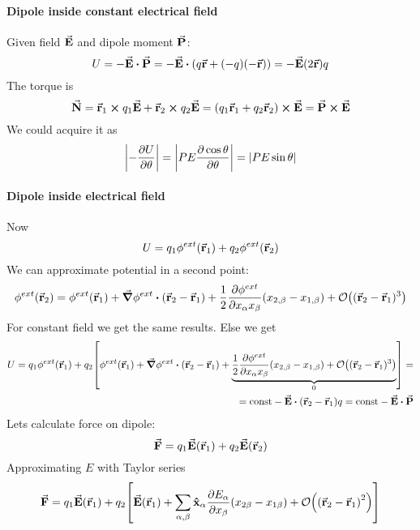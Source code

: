 \paragraph{Dipole inside constant electrical field}
Given field $\va{E}$ and dipole moment $\va{P}$:
$$U = - \va{E} \vdot \va{P} = -\va{E} \vdot \qty(q\va{r} + (-q) (-\va{r})) = -\va{E} (2\va{r})q$$
The torque is
$$\va{N}  = \va{r}_1 \cross q_1 \va{E} + \va{r}_2 \cross q_2 \va{E} = \qty(q_1\va{r}_1 + q_2 \va{r}_2)\cross  \va{E} =\va{P} \cross \va{E}$$
We could acquire it as
$$\qty|-\pdv{U}{\theta}| = \qty|PE\pdv{\cos \theta}{\theta}|  = \qty|PE\sin \theta|$$
\paragraph{Dipole inside electrical field}
Now
$$U = q_1 \phi^{ext} (\va{r}_1) + q_2 \phi^{ext} (\va{r}_2) $$
We can approximate potential in a second point:
$$\phi^{ext}(\va{r}_2) = \phi^{ext}(\va{r}_1) + \grad{\phi^{ext}} \vdot (\va{r}_2 -\va{r}_1) + \frac{1}{2} \pdv{\phi^{ext}}{x_\alpha x_\beta} (x_{2, \alpha}-x_{1, \alpha})(x_{2, \beta}-x_{1, \beta}) + \order{(\va{r}_2-\va{r}_1)^3}$$
For constant field we get the same results. Else we get
\begin{align*}
U = q_1 \phi^{ext} (\va{r}_1) + q_2 \qty[\phi^{ext}(\va{r}_1) + \grad{\phi^{ext}} \vdot (\va{r}_2 -\va{r}_1) + \underbrace{\frac{1}{2} \pdv{\phi^{ext}}{x_\alpha x_\beta} (x_{2, \alpha}-x_{1, \alpha})(x_{2, \beta}-x_{1, \beta}) + \order{(\va{r}_2-\va{r}_1)^3}}_{0}] =\\= \text{const} - \va{E}\vdot (\va{r}_2 -\va{r}_1) q =  \text{const} - \va{E}\vdot \va{P}
\end{align*}
Lets calculate force on dipole:
$$\va{F} = q_1 \va{E}(\va{r}_1) + q_2 \va{E}(\va{r}_2)$$
Approximating $E$ with Taylor series
$$\va{F} = q_1 \va{E}(\va{r}_1) + q_2 \qty[\va{E}(\va{r}_1) + \sum_{\alpha, \beta} \vu{x}_\alpha \pdv{E_\alpha}{x_\beta} \qty(x_{2\beta} - x_{1\beta})  + \order{\qty(\va{r}_2-\va{r}_1)^2}] $$